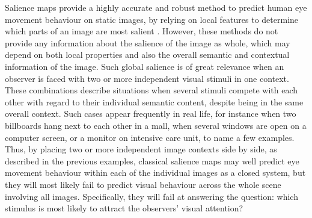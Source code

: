 {Salience maps provide a highly accurate and robust method to predict human eye movement behaviour on static images, by relying on local features to determine which parts of an image are most salient \citep{niebur1996salience, itti2001salience, kowler2011eyemovements}. However, these methods do not provide any information about the salience of the image as whole, which may depend on both local properties and also the overall semantic and contextual information of the image. Such global salience is of great relevance when an observer is faced with two or more independent visual stimuli in one context. These combinations describe situations when several stimuli compete with each other with regard to their individual semantic content, despite being in the same overall context. Such cases appear frequently in real life, for instance when two billboards hang next to each other in a mall, when several windows are open on a computer screen, or a monitor on intensive care unit, to name a few examples. Thus, by placing two or more independent image contexts side by side, as described in the previous examples, classical salience maps may well predict eye movement behaviour within each of the individual images as a closed system, but they will most likely fail to predict visual behaviour across the whole scene involving all images. Specifically, they will fail at answering the question: which stimulus is most likely to attract the observers' visual attention?

}
